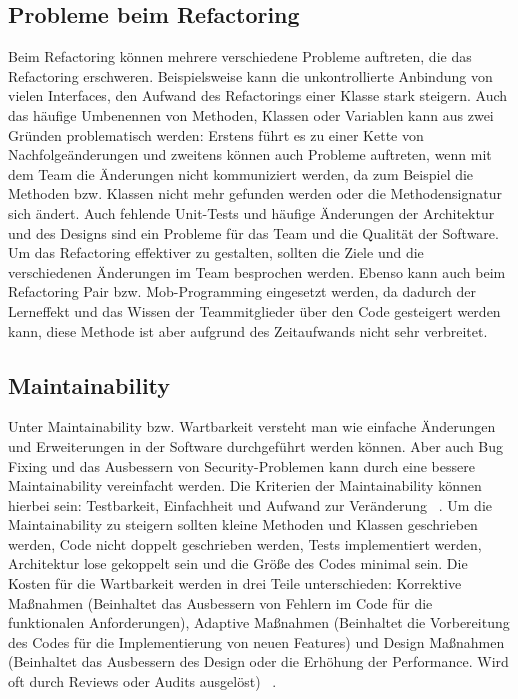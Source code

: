 \subsection{Probleme beim Refactoring}
Beim Refactoring können mehrere verschiedene Probleme auftreten, die das Refactoring erschweren. Beispielsweise kann die unkontrollierte Anbindung von vielen Interfaces, den Aufwand des Refactorings einer Klasse stark steigern. Auch das häufige Umbenennen von Methoden, Klassen oder Variablen kann aus zwei Gründen problematisch werden: Erstens führt es zu einer Kette von Nachfolgeänderungen und zweitens können auch Probleme auftreten, wenn mit dem Team die Änderungen nicht kommuniziert werden, da zum Beispiel die Methoden bzw. Klassen nicht mehr gefunden werden oder die Methodensignatur sich ändert. Auch fehlende Unit-Tests und häufige Änderungen der Architektur und des Designs sind ein Probleme für das Team und die Qualität der Software. ~\parencite{khanambarriers} \\
Um das Refactoring effektiver zu gestalten, sollten die Ziele und die verschiedenen Änderungen im Team besprochen werden. Ebenso kann auch beim Refactoring Pair bzw. Mob-Programming eingesetzt werden, da dadurch der Lerneffekt und das Wissen der Teammitglieder über den Code gesteigert werden kann, diese Methode ist aber aufgrund des Zeitaufwands nicht sehr verbreitet. 
\subsection{Maintainability}
Unter Maintainability bzw. Wartbarkeit versteht man wie einfache Änderungen und Erweiterungen in der Software durchgeführt werden können. Aber auch Bug Fixing und das Ausbessern von Security-Problemen kann durch eine bessere Maintainability vereinfacht werden. Die Kriterien der Maintainability können hierbei sein: Testbarkeit, Einfachheit und Aufwand zur Veränderung ~\parencite{kukrejaMaintainability}. Um die Maintainability zu steigern sollten kleine Methoden und Klassen geschrieben werden, Code nicht doppelt geschrieben werden, Tests implementiert werden, Architektur lose gekoppelt sein und die Größe des Codes minimal sein. Die Kosten für die Wartbarkeit werden in drei Teile unterschieden: Korrektive Maßnahmen (Beinhaltet das Ausbessern von Fehlern im Code für die funktionalen Anforderungen), Adaptive Maßnahmen (Beinhaltet die Vorbereitung des Codes für die Implementierung von neuen Features) und Design Maßnahmen (Beinhaltet das Ausbessern des Design oder die Erhöhung der Performance. Wird oft durch Reviews oder Audits ausgelöst) ~\parencite{cheaitoMaintainability}.
